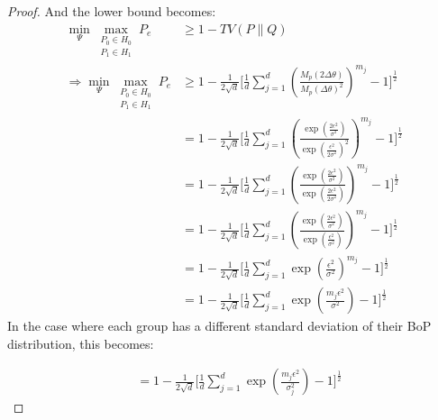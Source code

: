 \begin{proof}
And the lower bound becomes:
\begin{align*}
    \min _{\Psi} 
    \max _{\substack{P_0 \in H_0 \\ P_1 \in H_1}}
        P_e 
        &\geq 
        1 - TV(P\parallel Q)\\
      \Rightarrow
      \min _{\Psi} 
    \max _{\substack{P_0 \in H_0 \\ P_1 \in H_1}}
        P_e 
        &\geq 1 - \frac{1}{2\sqrt{d}} 
        \Bigg[ \frac{1}{d} \sum_{j=1}^d
            \left(\frac{M_p(2\Delta\theta)}{M_p(\Delta \theta)^2}\right)^{m_j}
            -
            1
            \Bigg]^{\frac{1}{2}}\\
      &= 1 - \frac{1}{2\sqrt{d}} 
        \Bigg[ \frac{1}{d} \sum_{j=1}^d
            \left(\frac{\exp\left(\frac{2\epsilon^2}{\sigma^2}\right)}{\exp\left(\frac{\epsilon^2}{2\sigma^2}\right)^2}\right)^{m_j}
            -
            1
            \Bigg]^{\frac{1}{2}}\\
      &= 1 - \frac{1}{2\sqrt{d}} 
        \Bigg[ \frac{1}{d} \sum_{j=1}^d
            \left(\frac{\exp\left(\frac{2\epsilon^2}{\sigma^2}\right)}{\exp\left(\frac{2\epsilon^2}{2\sigma^2}\right)}\right)^{m_j}
               -
            1
            \Bigg]^{\frac{1}{2}}\\
      &= 1 - \frac{1}{2\sqrt{d}} 
        \Bigg[ \frac{1}{d} \sum_{j=1}^d
            \left(\frac{\exp\left(\frac{2\epsilon^2}{\sigma^2}\right)}{\exp\left(\frac{\epsilon^2}{\sigma^2}\right)}\right)^{m_j}
            -
            1
            \Bigg]^{\frac{1}{2}}\\
      &= 1 - \frac{1}{2\sqrt{d}} 
        \Bigg[ \frac{1}{d} \sum_{j=1}^d
            \exp\left(\frac{\epsilon^2}{\sigma^2}\right)^{m_j}
            -
            1
            \Bigg]^{\frac{1}{2}}\\
      &= 1 - \frac{1}{2\sqrt{d}} 
        \Bigg[
            \frac{1}{d} \sum_{j=1}^d \exp\left(\frac{{m_j}\epsilon^2}{\sigma^2}\right)
            -
            1
            \Bigg]^{\frac{1}{2}}
\end{align*}
In the case where each group has a different standard deviation of their BoP distribution, this becomes:

\begin{align*}
    &= 1 - \frac{1}{2\sqrt{d}} 
        \Bigg[
            \frac{1}{d} \sum_{j=1}^d \exp\left(\frac{{m_j}\epsilon^2}{\sigma_j^2}\right)
            -
            1
            \Bigg]^{\frac{1}{2}}
\end{align*}
\end{proof}


